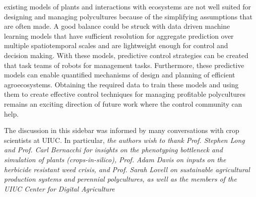  existing models of plants and interactions with ecosystems \cite{Stehfest2007a,Foley1996a, Kucharik2003a,Friedl2010a, Rodrigues2010a, Nunes2013a} are not well suited for designing and managing polycultures because of the simplifying assumptions that are often made. A good balance could be struck with data driven machine learning models that have sufficient resolution for aggregate prediction over multiple spatiotemporal scales and are lightweight enough for control and decision making. With these models, predictive control strategies can be created that task teams of robots for management tasks. Furthermore, these predictive models can enable quantified mechanisms of design and planning of efficient agroecosystems. %
 Obtaining the required data to train these models and using them to create effective control techniques for managing profitable polycultures remains an exciting direction of future work where the control community can help.
 
 The discussion in this sidebar was informed by many conversations with  crop scientists at UIUC. In particular, 
\textit{the authors wish to thank Prof. Stephen Long and Prof. Carl Bernacchi for insights on the phenotyping bottleneck and simulation of plants (\textit{crops-in-silico}), Prof. Adam Davis on inputs on the herbicide resistant weed crisis, and Prof. Sarah Lovell on sustainable agricultural production systems and perennial polycultures, as well as the members of the UIUC Center for Digital Agriculture} 

